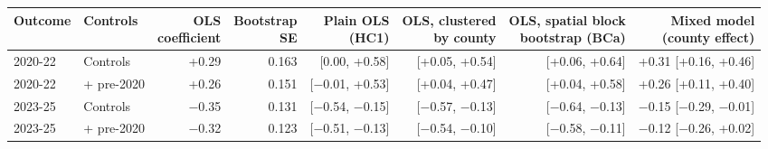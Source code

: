 \footnotesize\setlength{\tabcolsep}{1.8pt}
\begin{tabular}{llrrrrrr}
\toprule
Outcome & Controls & \shortstack[r]{OLS\\coefficient} & \shortstack[r]{Bootstrap\\SE} & \shortstack[r]{Plain OLS\\(HC1)} & \shortstack[r]{OLS, clustered\\by county} & \shortstack[r]{OLS, spatial block\\bootstrap (BCa)} & \shortstack[r]{Mixed model\\(county effect)} \\
\midrule
2020-22 & Controls & +0.29 & 0.163 & [0.00, +0.58] & [+0.05, +0.54] & [+0.06, +0.64] & +0.31 [+0.16, +0.46] \\
2020-22 & + pre-2020 & +0.26 & 0.151 & [$-$0.01, +0.53] & [+0.04, +0.47] & [+0.04, +0.58] & +0.26 [+0.11, +0.40] \\
2023-25 & Controls & $-$0.35 & 0.131 & [$-$0.54, $-$0.15] & [$-$0.57, $-$0.13] & [$-$0.64, $-$0.13] & $-$0.15 [$-$0.29, $-$0.01] \\
2023-25 & + pre-2020 & $-$0.32 & 0.123 & [$-$0.51, $-$0.13] & [$-$0.54, $-$0.10] & [$-$0.58, $-$0.11] & $-$0.12 [$-$0.26, +0.02] \\
\bottomrule
\end{tabular}

